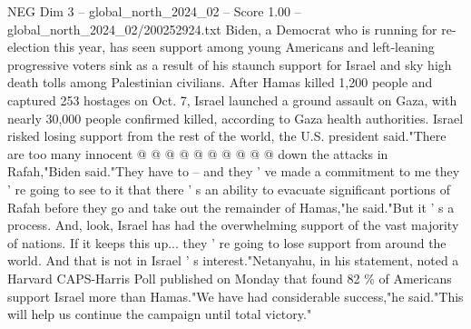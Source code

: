 \begin{textsample}{NEG Dim 3 – global\_north\_2024\_02 – Score 1.00 – global\_north\_2024\_02/200252924.txt}
Biden, a Democrat who is running for re-election this year, has seen support among young Americans and left-leaning progressive voters sink as a result of his staunch support for Israel and sky high death tolls among Palestinian civilians.
After Hamas killed 1,200 people and captured 253 hostages on Oct. 7, Israel launched a ground assault on Gaza, with nearly 30,000 people confirmed killed, according to Gaza health authorities.
Israel risked losing support from the rest of the world, the U.S. president said."There are too many innocent @ @ @ @ @ @ @ @ @ @ down the attacks in Rafah,"Biden said."They have to -- and they ' ve made a commitment to me they ' re going to see to it that there ' s an ability to evacuate significant portions of Rafah before they go and take out the remainder of Hamas,"he said."But it ' s a process.
And, look, Israel has had the overwhelming support of the vast majority of nations.
If it keeps this up... they ' re going to lose support from around the world.
And that is not in Israel ' s interest."Netanyahu, in his statement, noted a Harvard CAPS-Harris Poll published on Monday that found 82 \% of Americans support Israel more than Hamas."We have had considerable success,"he said."This will help us continue the campaign until total victory."

\end{textsample}
